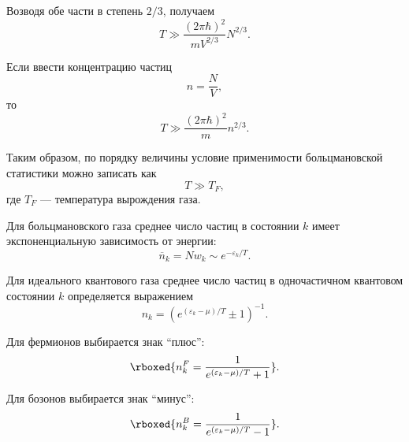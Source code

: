 \documentclass[../final.tex]{subfiles}
\begin{document}
Возводя обе части в степень $2/3$, получаем
%
\begin{equation*}
    T
    \gg
    \frac{
        (2\pi\hbar)^2
    }{
        mV^{2/3}
    }
    N^{2/3}.
\end{equation*}

Если ввести концентрацию частиц
%
\begin{equation*}
    n
    =
    \frac{N}{V},
\end{equation*}
%
то
%
\begin{equation*}
    T
    \gg
    \frac{
        (2\pi\hbar)^2
    }{
        m
    }
    n^{2/3}.
\end{equation*}

Таким образом, по порядку величины условие применимости
больцмановской статистики можно записать как
%
\begin{equation*}
    T
    \gg
    T_F,
\end{equation*}
%
где $T_F$ --- температура вырождения газа.

Для больцмановского газа среднее число частиц в состоянии $k$
имеет экспоненциальную зависимость от энергии:
%
\begin{equation*}
    \overline{n}_k
    =
    Nw_k
    \sim
    e^{-\varepsilon_k/T}.
\end{equation*}




Для идеального квантового газа среднее число частиц
в одночастичном квантовом состоянии $k$ определяется выражением
%
\begin{equation*}
    n_k
    =
    \left(
        e^{(\varepsilon_k-\mu)/T}
        \pm 1
    \right)^{-1}.
\end{equation*}

Для фермионов выбирается знак ``плюс'':
%
\begin{equation*}
    \rboxed{
        n_k^{F}
        =
        \frac{
            1
        }{
            e^{(\varepsilon_k-\mu)/T}+1
        }
    }.
\end{equation*}

Для бозонов выбирается знак ``минус'':
%
\begin{equation*}
    \rboxed{
        n_k^{B}
        =
        \frac{
            1
        }{
            e^{(\varepsilon_k-\mu)/T}-1
        }
    }.
\end{equation*}
\end{document}
